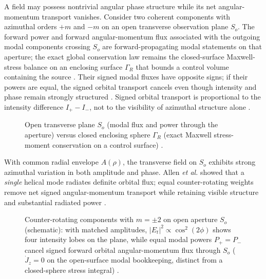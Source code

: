 A field may possess nontrivial angular phase structure while its net angular-momentum transport vanishes. Consider two coherent components with azimuthal orders \(+m\) and \(-m\) on an open transverse observation plane \(S_o\). The forward power and forward angular-momentum flux associated with the outgoing modal components crossing \(S_o\) are forward-propagating modal statements on that aperture; the exact global conservation law remains the closed-surface Maxwell-stress balance on an enclosing surface \(\Gamma_R\) that bounds a control volume containing the source \cite{stratton1941,belinfante1940}. Their signed modal fluxes have opposite signs; if their powers are equal, the signed orbital transport cancels even though intensity and phase remain strongly structured \cite{allen1992}. Signed orbital transport is proportional to the intensity difference \(I_+-I_-\), not to the visibility of azimuthal structure alone \cite{stratton1941}.

\begin{figure}[t]
\centering
\VolIPhysFig{\VolIPhysOpenPlaneVsClosedSphere}
\caption{Open transverse plane $S_o$ (modal flux and power through the aperture) versus closed enclosing sphere $\Gamma_R$ (exact Maxwell stress-moment conservation on a control surface) \cite{stratton1941,beth1936}.}
\label{fig:ch1.open-plane-vs-closed}
\end{figure}

With common radial envelope \(A(\rho)\), the transverse field on \(S_o\) exhibits strong azimuthal variation in both amplitude and phase. Allen \emph{et al.} \cite{allen1992} showed that a \emph{single} helical mode radiates definite orbital flux; equal counter-rotating weights remove net signed angular-momentum transport while retaining visible structure and substantial radiated power \cite{poynting1884}.

\begin{figure}[t]
\centering
\VolIPhysFig{\VolIPhysCounterRotatingAperture}
\caption{Counter-rotating components with $m=\pm2$ on open aperture $S_o$ (schematic): with matched amplitudes, $|E_t|^2\propto\cos^2(2\phi)$ shows four intensity lobes on the plane, while equal modal powers $P_+=P_-$ cancel signed forward orbital angular-momentum flux through $S_o$ ($\dot J_z=0$ on the open-surface modal bookkeeping, distinct from a closed-sphere stress integral) \cite{allen1992,poynting1884}.}
\label{fig:ch1.ex62-counter-rotating-aperture}
\end{figure}

